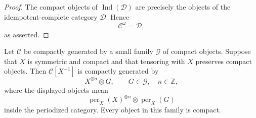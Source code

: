 \begin{proof}
The compact objects of \(\operatorname{Ind}(\mathcal D)\) are precisely the
objects of the idempotent-complete category \(\mathcal D\).  Hence
\[
    \mathcal C^\omega
    =
    \mathcal D,
\]
as asserted.
\end{proof}

\begin{proposition}
\label{prop:compact-generation-periodization}
Let \(\mathcal C\) be compactly generated by a small family
\(\mathcal G\) of compact objects.  Suppose that \(X\) is symmetric and
compact and that tensoring with \(X\) preserves compact objects.  Then
\(\mathcal C[X^{-1}]\) is compactly generated by
\[
    X^{\otimes n}\otimes G,
    \qquad
    G\in\mathcal G,
    \quad
    n\in\mathbb Z,
\]
where the displayed objects mean
\[
    \operatorname{per}_X(X)^{\otimes n}
    \otimes
    \operatorname{per}_X(G)
\]
inside the periodized category.  Every object in this family is compact.
\end{proposition}

